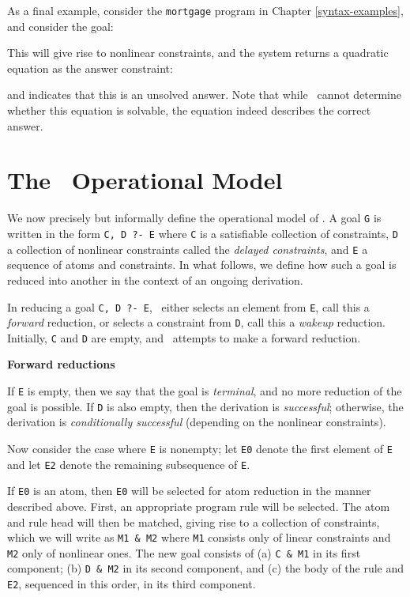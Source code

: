 As a final example, consider the {\tt mortgage} program
in Chapter \ref{syntax-examples}, and consider the goal:


\noindent
This will give rise to nonlinear constraints,
and the system returns a quadratic equation as the answer constraint:


\noindent
and indicates that this is an unsolved answer.
Note that while \CLPR\ cannot
determine whether this equation is solvable, the equation indeed
describes the correct answer.

\section{The \CLPR\ Operational Model} 

We now precisely but informally define the operational model of \CLPR.
A goal {\tt G} is written in the form {\tt C, D ?- E} where 
{\tt C} is a satisfiable collection of constraints, 
{\tt D} a collection of nonlinear constraints
called the {\em delayed constraints}, and 
{\tt E} a sequence of atoms and constraints.  
In what follows, we define how such a goal
is reduced into another in the context of an ongoing derivation.

In reducing a goal {\tt C, D ?- E}, 
\CLPR\ either selects an element from {\tt E},
call this a {\em forward} reduction, or selects a
constraint from {\tt D}, call this
a {\em wakeup} reduction.  Initially,
{\tt C} and {\tt D} are empty, and \CLPR\ attempts to
make a forward reduction.

\noindent
{\bf Forward reductions}

If {\tt E} is empty, then we say that the
goal is {\em terminal}, and no more reduction of the goal is possible.
If {\tt D} is also empty, then the derivation is {\em successful};
otherwise, the derivation is {\em conditionally successful} (depending
on the nonlinear constraints).

Now consider the case where {\tt E} is nonempty;
let {\tt E0} denote the first element of {\tt E} and
let {\tt E2} denote the remaining subsequence of {\tt E}.

If {\tt E0} is an atom, then {\tt E0} will be selected for atom reduction
in the manner described above.
First, an appropriate program rule will be selected. 
The atom and rule head will then be matched, giving rise to
a collection of constraints, which we will write as {\tt M1 \& M2}
where {\tt M1} consists only of linear constraints and {\tt M2}
only of nonlinear ones.  The new goal consists of 
(a) {\tt C \& M1} in its first component; 
(b) {\tt D \& M2} in its second component, and
(c) the body of the rule and {\tt E2}, sequenced in this order,
in its third component.

